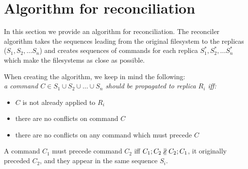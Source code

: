 \section{Algorithm for reconciliation}
\label{sec:alg}

In this section we provide an algorithm for reconciliation. The reconciler
algorithm takes the sequences leading from the original filesystem to the
replicas (\(S_1, S_2, \ldots S_n\)) and creates sequences of commands for
each replica \(S_1^*, S_2^*, \ldots S_n^*\) which make the
filesystems as close as possible. 

When creating the algorithm, we keep in mind the following:\\
\emph{a command 
\(C\in {S}_1\cup{S}_2\cup\ldots\cup{S}_n\) 
should be propagated to replica \(R_i\) iff:}
\begin{itemize}
\item \(C\) is not already applied to \(R_i\)
\item there are no conflicts on command \(C\)
\item there are no conflicts on any command which must precede \(C\) 
\end{itemize}

\medskip{}\medskip

A command \(C_1\) must precede command \(C_2\) iff 
\(C_1; C_2\nparallel C_2; C_1\), it originally preceded \(C_2\),
and they appear in the same sequence \(S_i\). 

